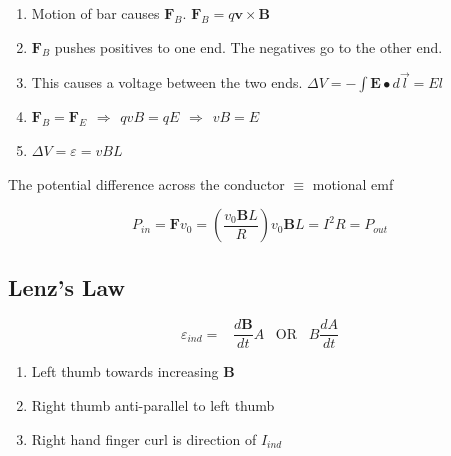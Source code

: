 \documentclass[twocolumn, 12pt]{article}
\begin{document}
\begin{enumerate}
    \item Motion of bar causes \(\textbf{F}_B\). \(\textbf{F}_B=q\textbf{v} \times \textbf{B}\)
    \item \(\textbf{F}_B\) pushes positives to one end. The negatives go to the other end.
    \item This causes a voltage between the two ends. \(\Delta V = -\int \textbf{E} \bullet d\vec{l} = El\)
    \item \(\textbf{F}_B =\textbf{F}_E  \hspace{5pt} \Longrightarrow  \hspace{5pt} qvB=qE \hspace{5pt} \Longrightarrow \hspace{5pt} vB=E \)
    \item \( \Delta V = \varepsilon = vBL\)
\end{enumerate}
\begin{center}
    The potential difference across the conductor \(\equiv\) motional emf
\end{center} 

\begin{equation*}
    P_{in} = \textbf{F}v_0 = \left(\frac{v_0\textbf{B} L}{R} \right)  v_0\textbf{B} L = I^2R = P_{out}
\end{equation*}





\subsection*{Lenz's Law}
\begin{equation*}
    \varepsilon_{ind} = \hspace{10pt} \frac{d\textbf{B}}{dt}A \hspace{10pt} \text{OR} \hspace{10pt} B \frac{dA}{dt}
\end{equation*}

\begin{enumerate}
    \item Left thumb towards increasing \textbf{B}
    \item Right thumb anti-parallel to left thumb 
    \item Right hand finger curl is direction of \(I_{ind}\)
\end{enumerate}
\end{document}
